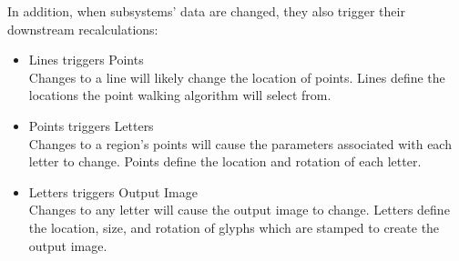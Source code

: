 In addition, when subsystems' data are changed, they also trigger their downstream recalculations:
\begin{itemize}
      \item Lines triggers Points \\
            Changes to a line will likely change the location of points.
            Lines define the locations the point walking algorithm will select from.

      \item Points triggers Letters \\
            Changes to a region's points will cause the parameters associated with each letter to change.
            Points define the location and rotation of each letter.

      \item Letters triggers Output Image \\
            Changes to any letter will cause the output image to change.
            Letters define the location, size, and rotation of glyphs which are stamped to create the output image.
\end{itemize}

